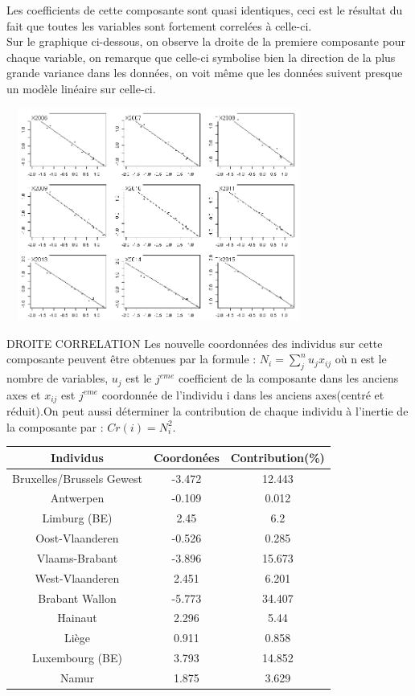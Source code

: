 \documentclass{article}
\begin{document}
Les coefficients de cette composante sont quasi identiques, ceci est le résultat du fait que toutes les variables sont fortement correlées à celle-ci.
\\Sur le graphique ci-dessous, on observe la droite de la premiere composante pour chaque variable, on remarque que celle-ci symbolise bien la direction de la plus grande variance dans les données, on voit même que les données suivent presque un modèle linéaire sur celle-ci. 

	\includegraphics[width=10cm,height=7cm]{"score"} 
	
	
DROITE CORRELATION
Les nouvelle coordonnées des individus sur cette composante peuvent être obtenues par la formule : $N_i=\sum_j^n u_j x_{ij}$ où n est le nombre de variables, $u_j$ est le $j^{eme}$ coefficient de la composante dans les anciens axes et $x_{ij}$ est $j^{eme}$ coordonnée de l'individu i dans les anciens axes(centré et réduit).On peut aussi déterminer la contribution de chaque individu à l'inertie de la composante par : $Cr(i)=N_i^2$.
\begin{table}[h]
\centering 
\begin{tabular}{|c|c|c|} 
  \hline
  Individus & Coordonées & Contribution(\%)\\
  \hline
  Bruxelles/Brussels Gewest & -3.472 & 12.443\\
  \hline  
  Antwerpen         &   -0.109    &    0.012\\
  \hline  
  Limburg (BE)       &     2.45   &   6.2\\
  \hline  
  Oost-Vlaanderen     &  -0.526   &    0.285\\
  \hline  
  Vlaams-Brabant       &  -3.896 &    15.673\\
  \hline  
  West-Vlaanderen     &   2.451  &     6.201\\
  \hline  
  Brabant Wallon     &   -5.773 &     34.407\\
  \hline
  Hainaut             &  2.296 &      5.44\\
  \hline  
  Liège              &  0.911  &     0.858\\
  \hline  
  Luxembourg (BE)     & 3.793 &      14.852\\
  \hline
  Namur              & 1.875   &      3.629\\
  \hline
\end{tabular}
\end{table}
\end{document}
